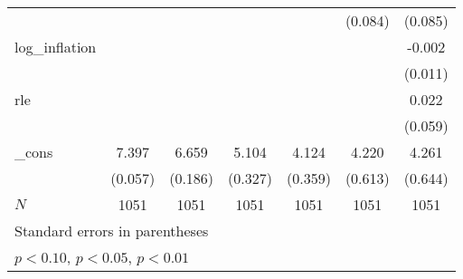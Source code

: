 {\begin{tabular}{l*{6}{c}}
            &                     &                     &                     &                     &     (0.084)         &     (0.085)         \\
\addlinespace
log\_inflation&                     &                     &                     &                     &                     &      -0.002         \\
            &                     &                     &                     &                     &                     &     (0.011)         \\
\addlinespace
rle         &                     &                     &                     &                     &                     &       0.022         \\
            &                     &                     &                     &                     &                     &     (0.059)         \\
\addlinespace
\_cons      &       7.397\sym{***}&       6.659\sym{***}&       5.104\sym{***}&       4.124\sym{***}&       4.220\sym{***}&       4.261\sym{***}\\
            &     (0.057)         &     (0.186)         &     (0.327)         &     (0.359)         &     (0.613)         &     (0.644)         \\
\midrule
\(N\)       &        1051         &        1051         &        1051         &        1051         &        1051         &        1051         \\
\bottomrule
\multicolumn{7}{l}{\footnotesize Standard errors in parentheses}\\
\multicolumn{7}{l}{\footnotesize \sym{*} \(p<0.10\), \sym{**} \(p<0.05\), \sym{***} \(p<0.01\)}\\
\end{tabular}
}
